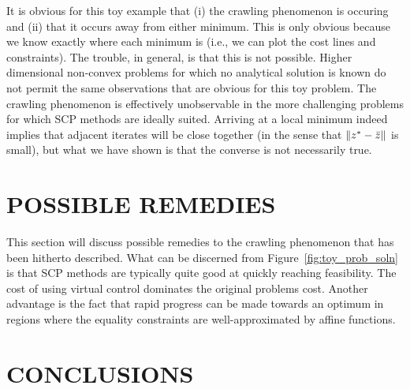 \documentclass[letterpaper, 10 pt, conference]{ieeeconf}
\begin{document}
It is obvious for this toy example that (i) the crawling phenomenon is occuring and (ii) that it occurs away from either minimum. This is only obvious because we know exactly where each minimum is (i.e., we can plot the cost lines and constraints). The trouble, in general, is that this is not possible. Higher dimensional non-convex problems for which no analytical solution is known do not permit the same observations that are obvious for this toy problem. The crawling phenomenon is effectively unobservable in the more challenging problems for which SCP methods are ideally suited. Arriving at a local minimum indeed implies that adjacent iterates will be close together (in the sense that $\|z^*-\bar{z}\|$ is small), but what we have shown is that the converse is not necessarily true. 


\section{POSSIBLE REMEDIES}\label{sec:remedies}

This section will discuss possible remedies to the crawling phenomenon that has been hitherto described. What can be discerned from Figure~\ref{fig:toy_prob_soln} is that SCP methods are typically quite good at quickly reaching feasibility. The cost of using virtual control dominates the original problems cost. Another advantage is the fact that rapid progress can be made towards an optimum in regions where the equality constraints are well-approximated by affine functions.


\section{CONCLUSIONS}\label{sec:conclusion}


\end{document}
